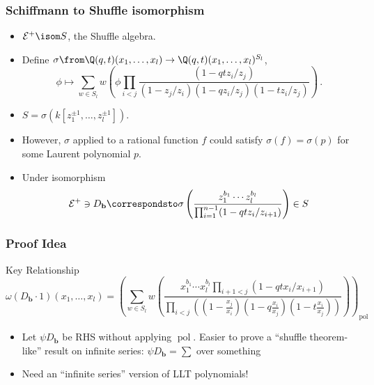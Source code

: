 \documentclass{beamer}
\newcommand{\Lcal}{{\mathcal L}}
\newcommand{\Ecal}{{\mathcal E}}
\newcommand{\bb}{{\mathbf b}}
\newcommand{\aA}{{\mathbf a}}
\DeclareMathOperator{\pol}{pol}
\newcounter{c}
\begin{document}
\begin{frame}
  \frametitle{Schiffmann to Shuffle isomorphism}
  \begin{itemize}
  \item \(\Ecal^+ \isom S\), the Shuffle algebra.\pause
  \item Define \(\sigma \from \Q(q,t)(x_1,\ldots,x_l) \to
    \Q(q,t)(x_1,\ldots,x_l)^{S_l}\), \[
      \phi \mapsto \sum_{w \in S_l} w\left( \phi \prod_{i<j} \frac{(1-qt
          z_i/z_j)}{(1-z_j/z_i)(1-qz_i/z_j)(1-tz_i/z_j) } \right)\,.
    \]\pause
  \item \(S = \sigma(k[z_1^{\pm 1},\ldots, z_l^{\pm 1}])\). \pause
  \item However, \(\sigma\) applied to a rational function \(f\) could
    satisfy \(\sigma(f) = \sigma(p)\) for some Laurent polynomial \(p\).\pause
  \item Under isomorphism \[
      \Ecal^+ \ni D_\bb \correspondsto \sigma
\left(      \frac{z_1^{b_1} \cdots
        z_l^{b_l}}{\prod_{i=1}^{n-1} (1-qt z_i/z_{i+1})}
\right)      \in S
    \]
  \end{itemize}
\end{frame}
\begin{frame}
  \frametitle{Proof Idea}
  \vspace{-0.3em}
  \begin{block}{Key Relationship}
    \[
      \omega(D_\bb \cdot 1)(x_1,\ldots,x_l) =
\left(      \sum_{w \in S_l} w \left(\frac{x_1^{b_1}\cdots
          x_l^{b_l}\prod_{i+1 < j}(1-qt x_i/x_{i+1})}{\prod_{i<j}((1-\frac{x_j}{x_i})(1-q\frac{x_i}{x_j})(1-t\frac{x_i}{x_j}))}  \right)
\right)_{\pol}    \]
  \end{block}\pause
  \begin{itemize}
  \item Let \(\psi D_\bb\) be RHS without applying \(\pol\). Easier to
    prove a ``shuffle theorem-like'' result on infinite series:
    \(\psi D_\bb = \sum \) over something \pause

    \item Need an ``infinite series'' version of LLT polynomials!
  \end{itemize}
\end{frame}
\end{document}
